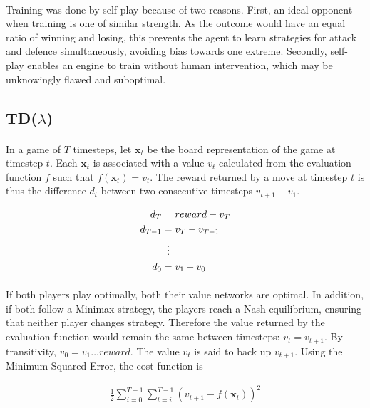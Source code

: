 \documentclass[12pt,a4paper]{book}
\begin{document}
\paragraph{} Training was done by self-play because of two reasons. First, an ideal opponent when training is one of similar strength. As the outcome would have an equal ratio of winning and losing, this prevents the agent to learn strategies for attack and defence simultaneously, avoiding bias towards one extreme. Secondly, self-play enables an engine to train without human intervention, which may be unknowingly flawed and suboptimal. \cite{ban}

\subsection{TD($\lambda$)}

\paragraph{} In a game of $T$ timesteps, let $\mathbf{x}_t$ be the board representation of the game at timestep $t$. Each $\mathbf{x}_t$ is associated with a value $v_t$ calculated from the evaluation function $f$ such that $f(\mathbf{x}_t) = v_t$. The reward returned by a move at timestep $t$ is thus the difference $d_{t}$ between two consecutive timesteps $v_{t+1} - v_{1}$.

\begin{align*}
  d_{T} &= reward - v_{T} \\
  d_{T-1} &= v_{T} - v_{T-1} \\
        &\mathrel{\makebox[\widthof{=}]{\vdots}} \\
  d_0 &= v_1 - v_0
\end{align*}

\paragraph{} If both players play optimally, both their value networks are optimal. In addition, if both follow a Minimax strategy, the players reach a Nash equilibrium, ensuring that neither player changes strategy. Therefore the value returned by the evaluation function would remain the same between timesteps: $v_{t} = v_{t+1}$. By transitivity, $v_0 = v_1 \ldots reward$. The value $v_{t}$ is said to back up $v_{t+1}$. Using the Minimum Squared Error, the cost function is

\begin{align*}
  \frac{1}{2} \sum_{i=0}^{T-1} \sum_{t=i}^{T-1} (v_{t+1} - f(\mathbf{x}_t))^2
\end{align*}
\end{document}
